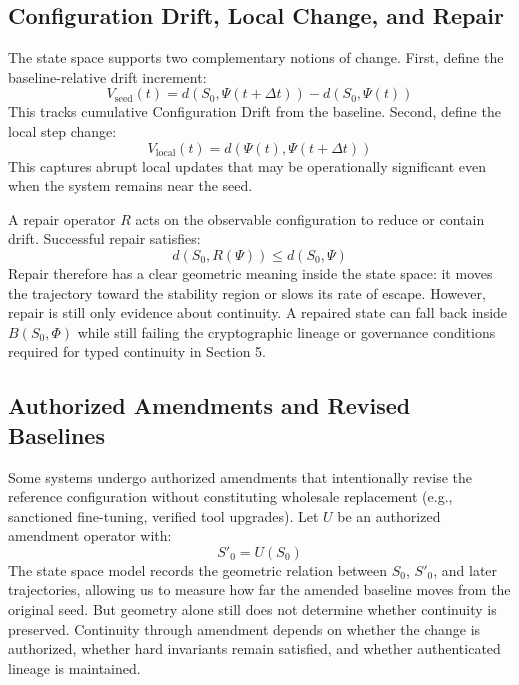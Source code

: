 \documentclass[11pt,a4paper]{article}
\begin{document}
\subsection{Configuration Drift, Local Change, and Repair}
The state space supports two complementary notions of change. First, define the baseline-relative drift increment:
\begin{equation}
V_{\text{seed}}(t) = d(S_{0}, \Psi(t+\Delta t)) - d(S_{0}, \Psi(t))
\end{equation}
This tracks cumulative Configuration Drift from the baseline. Second, define the local step change:
\begin{equation}
V_{\text{local}}(t) = d(\Psi(t), \Psi(t+\Delta t))
\end{equation}
This captures abrupt local updates that may be operationally significant even when the system remains near the seed.

A repair operator \(R\) acts on the observable configuration to reduce or contain drift. Successful repair satisfies:
\begin{equation}
d(S_{0}, R(\Psi)) \le d(S_{0}, \Psi)
\end{equation}
Repair therefore has a clear geometric meaning inside the state space: it moves the trajectory toward the stability region or slows its rate of escape. However, repair is still only evidence about continuity. A repaired state can fall back inside \(B(S_{0}, \Phi)\) while still failing the cryptographic lineage or governance conditions required for typed continuity in Section 5.

\subsection{Authorized Amendments and Revised Baselines}
Some systems undergo authorized amendments that intentionally revise the reference configuration without constituting wholesale replacement (e.g., sanctioned fine-tuning, verified tool upgrades). Let \(U\) be an authorized amendment operator with:
\begin{equation}
S'_{0} = U(S_{0})
\end{equation}
The state space model records the geometric relation between \(S_{0}\), \(S'_{0}\), and later trajectories, allowing us to measure how far the amended baseline moves from the original seed. But geometry alone still does not determine whether continuity is preserved. Continuity through amendment depends on whether the change is authorized, whether hard invariants remain satisfied, and whether authenticated lineage is maintained.
\end{document}
